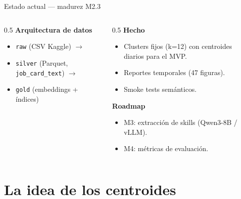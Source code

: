 \documentclass[aspectratio=169]{beamer}
\begin{document}
\begin{frame}{Estado actual --- madurez M2.3}
  \begin{columns}[T]
    \begin{column}{0.5\textwidth}
      \textbf{Arquitectura de datos}
      \begin{itemize}
        \item \texttt{raw} (CSV Kaggle) $\rightarrow$
        \item \texttt{silver} (Parquet, \texttt{job\_card\_text}) $\rightarrow$
        \item \texttt{gold} (embeddings + índices)
      \end{itemize}
    \end{column}
    \begin{column}{0.5\textwidth}
      \textbf{Hecho}
      \begin{itemize}
        \item Clusters fijos (k=12) con centroides diarios para el MVP.
        \item Reportes temporales (47 figuras).
        \item Smoke tests semánticos.
      \end{itemize}
      \textbf{Roadmap}
      \begin{itemize}
        \item M3: extracción de skills (Qwen3-8B / vLLM).
        \item M4: métricas de evaluación.
      \end{itemize}
    \end{column}
  \end{columns}
\end{frame}

\section{La idea de los centroides}
\end{document}
